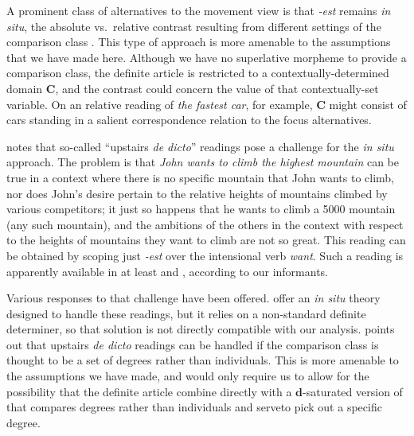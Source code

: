 \documentclass[output=paper
,modfonts
,nonflat]{langsci/langscibook}
\begin{document}
A prominent class of alternatives to the movement view is that \textit{-est} remains \textit{in situ}, the absolute vs.\ relative contrast resulting from different settings of the comparison class \citep{Gawron1995,FarkasKiss2000,SharvitStateva2002,Gutierrez-Rexach2006,Teodorescu2009,PanchevaTomaszewicz2012,CoppockBeaver2014,CoppockJosefson2015}.  This type of approach is more amenable to the assumptions that we have made here. Although we have no superlative morpheme to provide a comparison class, the definite article is restricted to a contextually-determined domain $\textbf{C}$, and the contrast could concern the value of that contextually-set variable. On an relative reading of \textit{the fastest car}, for example,  $\textbf{C}$ might consist of cars standing in a salient correspondence relation to the focus alternatives.

\citet{Heim1999} notes that so-called ``upstairs \textit{de dicto}'' readings pose a challenge for the \textit{in situ} approach. The problem is that \textit{John wants to climb the highest mountain} can be true in a context where there is no specific mountain that John wants to climb, nor does John's desire pertain to the relative heights of mountains climbed by various competitors; it just so happens that he wants to climb a 5000 mountain (any such mountain), and the ambitions of the others in the context with respect to the heights of mountains they want to climb are not so great. This reading can be obtained by scoping just \textit{-est} over the intensional verb \textit{want}. Such a reading is apparently available in at least  and , according to our informants.

Various responses to that challenge have been offered. \citet{SharvitStateva2002} offer an \textit{in situ} theory designed to handle these readings, but it relies on a non-standard definite determiner, so that solution is not directly compatible with our analysis.  \citet{Solomon2011} points out that upstairs \textit{de dicto} readings can be handled if the comparison class is thought to be a set of degrees rather than individuals. This is more amenable to the assumptions we have made, and would only require us to allow for the possibility that the definite article combine directly with a $\textbf{d}$-saturated version of \cmpr{} that compares degrees rather than individuals and serve\largerpage to pick out a specific degree.
\end{document}
